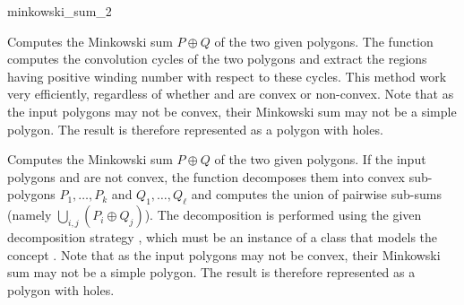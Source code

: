 
\ccRefPageBegin

\begin{ccRefFunction}{minkowski_sum_2}


   {Computes the Minkowski sum $P \oplus Q$ of the two given polygons.
    The function computes the convolution cycles of the two polygons and
    extract the regions having positive winding number with respect to these
    cycles. This method work very efficiently, regardless of whether 
    and  are convex or non-convex.
    Note that as the input polygons may not be convex, their Minkowski
    sum may not be a simple polygon. The result is therefore represented
    as a polygon with holes.
    }

   {Computes the Minkowski sum $P \oplus Q$ of the two given polygons.
    If the input polygons  and  are not convex, the function
    decomposes them into convex sub-polygons $P_1, \ldots, P_k$ and
    $Q_1, \ldots, Q_{\ell}$ and computes the union of pairwise sub-sums
    (namely $\bigcup_{i,j}{(P_i \oplus Q_j)}$).
    The decomposition is performed using the given decomposition strategy
    , which must be an instance of a class that models the
    concept .
    Note that as the input polygons may not be convex, their Minkowski
    sum may not be a simple polygon. The result is therefore represented
    as a polygon with holes.
    }

\end{ccRefFunction}

\ccRefPageEnd
